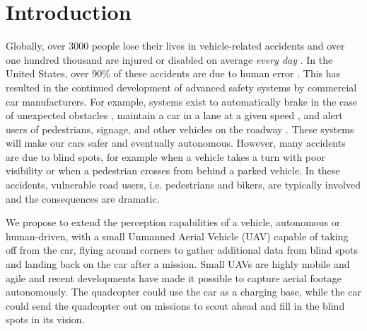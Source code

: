 
\section{Introduction}


%
%

Globally, over 3000 people lose their lives in vehicle-related accidents and over one hundred thousand are injured or disabled on average \emph{every day} \cite{ASIR2016}.
In the United States, over 90\% of these accidents are due to human error \cite{NHTSA_crash_stats}.
This has resulted in the continued development of advanced safety systems by commercial car manufacturers.
For example, systems exist to automatically brake in the case of unexpected obstacles \cite{Toyota_patent}, maintain a car in a lane at a given speed \cite{bradley2016tesla}, and alert users of pedestrians, signage, and other vehicles on the roadway \cite{Dagan_IVS_2004}. These systems will make our cars safer and eventually autonomous.
However, many accidents are due to blind spots, for example when a vehicle takes a turn with poor visibility or when a pedestrian crosses from behind a parked vehicle. In these accidents, vulnerable road users, i.e. pedestrians and bikers, are typically involved and the consequences are dramatic.

We propose to extend the perception capabilities of a vehicle, autonomous or human-driven, with a small Unmanned Aerial Vehicle (UAV) capable of taking off from the car, flying around corners to gather additional data from blind spots and landing back on the car after a mission. Small UAVs are highly mobile and agile and recent developments have made it possible to capture aerial footage autonomously\cite{naegeli17letters}.
The quadcopter could use the car as a charging base,
while the car could send the quadcopter out on missions to scout ahead and
fill in the blind spots in its vision.

